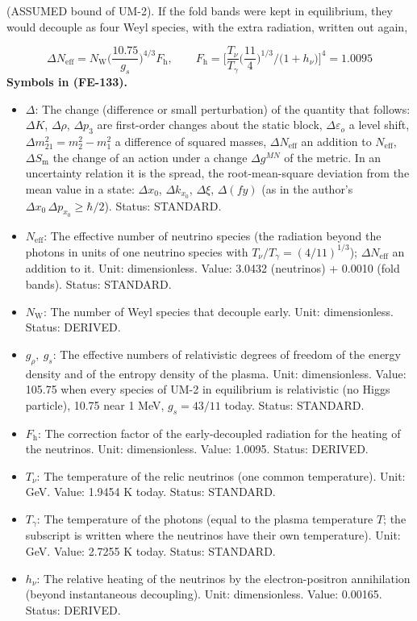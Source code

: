 \documentclass[
  10pt,
]{article}
\providecommand{\tightlist}{%
  \setlength{\itemsep}{0pt}\setlength{\parskip}{0pt}}
\begin{document}
(ASSUMED bound of UM-2). If the fold bands were kept in equilibrium,
they would decouple as four Weyl species, with the extra radiation,
written out again,

\[
\Delta N_{\mathrm{eff}} = N_{\mathrm{W}}\Big(\frac{10.75}{g_s}\Big)^{4/3}F_{\mathrm{h}},\qquad
F_{\mathrm{h}} = \Big[\frac{T_\nu}{T_\gamma}\Big(\frac{11}{4}\Big)^{1/3}\Big/\big(1 + h_\nu\big)\Big]^4
 = 1.0095 \tag{FE-133}
\] \textbf{Symbols in (FE-133).}

\begin{itemize}
\tightlist
\item
  \(\Delta\): The change (difference or small perturbation) of the
  quantity that follows: \(\Delta K\), \(\Delta\rho\), \(\Delta p_3\)
  are first-order changes about the static block,
  \(\Delta\varepsilon_o\) a level shift,
  \(\Delta m^2_{21} = m_2^2 - m_1^2\) a difference of squared masses,
  \(\Delta N_{\mathrm{eff}}\) an addition to \(N_{\mathrm{eff}}\),
  \(\Delta S_{\mathrm{m}}\) the change of an action under a change
  \(\Delta g^{MN}\) of the metric. In an uncertainty relation it is the
  spread, the root-mean-square deviation from the mean value in a state:
  \(\Delta x_0\), \(\Delta k_{x_0}\), \(\Delta\xi\), \(\Delta(fy)\) (as
  in the author's \(\Delta x_0\,\Delta p_{x_0} \ge \hbar/2\)). Status:
  STANDARD.
\item
  \(N_{\mathrm{eff}}\): The effective number of neutrino species (the
  radiation beyond the photons in units of one neutrino species with
  \(T_\nu/T_\gamma = (4/11)^{1/3}\)); \(\Delta N_{\mathrm{eff}}\) an
  addition to it. Unit: dimensionless. Value: 3.0432 (neutrinos) +
  0.0010 (fold bands). Status: STANDARD.
\item
  \(N_{\mathrm{W}}\): The number of Weyl species that decouple early.
  Unit: dimensionless. Status: DERIVED.
\item
  \(g_\rho,\ g_s\): The effective numbers of relativistic degrees of
  freedom of the energy density and of the entropy density of the
  plasma. Unit: dimensionless. Value: 105.75 when every species of UM-2
  in equilibrium is relativistic (no Higgs particle), 10.75 near 1 MeV,
  \(g_s = 43/11\) today. Status: STANDARD.
\item
  \(F_{\mathrm{h}}\): The correction factor of the early-decoupled
  radiation for the heating of the neutrinos. Unit: dimensionless.
  Value: 1.0095. Status: DERIVED.
\item
  \(T_\nu\): The temperature of the relic neutrinos (one common
  temperature). Unit: GeV. Value: 1.9454 K today. Status: STANDARD.
\item
  \(T_\gamma\): The temperature of the photons (equal to the plasma
  temperature \(T\); the subscript is written where the neutrinos have
  their own temperature). Unit: GeV. Value: 2.7255 K today. Status:
  STANDARD.
\item
  \(h_\nu\): The relative heating of the neutrinos by the
  electron-positron annihilation (beyond instantaneous decoupling).
  Unit: dimensionless. Value: 0.00165. Status: DERIVED.
\end{itemize}
\end{document}

